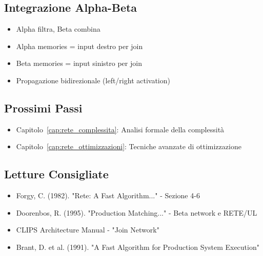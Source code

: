 \subsection{Integrazione Alpha-Beta}

\begin{itemize}
\item Alpha filtra, Beta combina
\item Alpha memories = input destro per join
\item Beta memories = input sinistro per join
\item Propagazione bidirezionale (left/right activation)
\end{itemize}

\subsection{Prossimi Passi}

\begin{itemize}
\item Capitolo~\ref{cap:rete_complessita}: Analisi formale della complessità
\item Capitolo~\ref{cap:rete_ottimizzazioni}: Tecniche avanzate di ottimizzazione
\end{itemize}

\subsection{Letture Consigliate}

\begin{itemize}
\item Forgy, C. (1982). "Rete: A Fast Algorithm..." - Sezione 4-6
\item Doorenbos, R. (1995). "Production Matching..." - Beta network e RETE/UL
\item CLIPS Architecture Manual - "Join Network"
\item Brant, D. et al. (1991). "A Fast Algorithm for Production System Execution"
\end{itemize}
